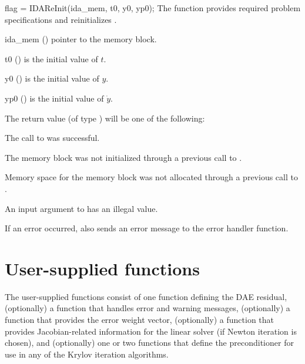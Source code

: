 {%
{
  flag = IDAReInit(ida\_mem, t0, y0, yp0);
}
{
  The function  provides required problem specifications 
  and reinitializes {\idas}.
}
{
  \begin{args}
  \item[ida\_mem] ()
    pointer to the {\idas} memory block.
  \item[t0] ()
    is the initial value of $t$.
  \item[y0] ()
    is the initial value of $y$. 
  \item[yp0] ()
    is the initial value of $\dot{y}$.   
  \end{args}
}
{
  The return value  (of type ) will be one of the following:
  \begin{args}
  \item[\Id{IDA\_SUCCESS}]
    The call to  was successful.
  \item[\Id{IDA\_MEM\_NULL}] 
    The {\idas} memory block was not initialized through a 
    previous call to .
  \item[\Id{IDA\_NO\_MALLOC}] 
    Memory space for the {\idas} memory block was not allocated through a 
    previous call to .
  \item[\Id{IDA\_ILL\_INPUT}] 
    An input argument to  has an illegal value.
  \end{args}
}
{
  If an error occurred,  also sends an error message to the
  error handler function.
}


\section{User-supplied functions}\label{ss:user_fct_sim}

The user-supplied functions consist of one function defining the DAE residual,
(optionally) a function that handles error and warning messages, 
(optionally) a function that provides the error weight vector,
(optionally) a function that provides Jacobian-related information for the linear 
solver (if Newton iteration is chosen), and (optionally) one or two functions 
that define the preconditioner for use in any of the Krylov iteration algorithms.
}
